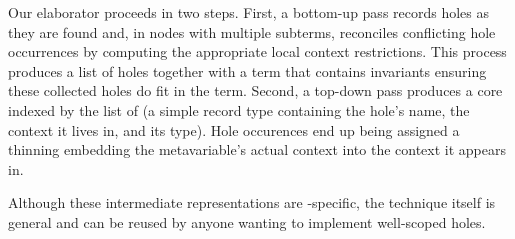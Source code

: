 Our elaborator proceeds in two steps.
%
First, a bottom-up pass records holes as they are found and, in nodes with multiple subterms, reconciles conflicting hole occurrences by computing the appropriate local context restrictions.
%
This process produces a list of holes together with a  term that contains invariants ensuring these collected holes do fit in the term.
%
Second, a top-down pass produces a core  indexed by the list of  (a simple record type containing the hole's name, the context it lives in, and its type).
%
Hole occurences end up being assigned a thinning embedding the metavariable's actual context into the context it appears in.

Although these intermediate representations are \Velo{}-specific, the technique
itself is general and can be reused by anyone wanting to implement well-scoped holes.

